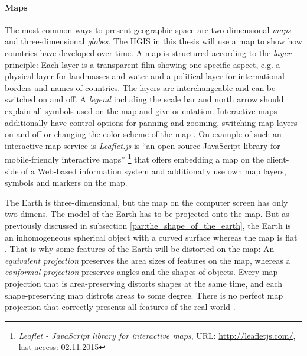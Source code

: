 
\paragraph{Maps} %
\label{par:maps}

The most common ways to present geographic space are two-dimensional \emph{maps} and three-dimensional \emph{globes}. The HGIS in this thesis will use a map to show how countries have developed over time. A map is structured according to the \emph{layer} principle: Each layer is a transparent film showing one specific aspect, e.g. a physical layer for landmasses and water and a political layer for international borders and names of countries. The layers are interchangeable and can be switched on and off. A \emph{legend} including the scale bar and north arrow should explain all symbols used on the map and give orientation. Interactive maps additionally have control options for panning and zooming, switching map layers on and off or changing the color scheme of the map
\cite[pp. 159-166]{bolstad2008gis}.
On example of such an interactive map service is \emph{Leaflet.js} is ``an open-source JavaScript library for mobile-friendly interactive maps''
\footnote{
  \textit{Leaflet - JavaScript library for interactive maps},
  URL: \url{http://leafletjs.com/},
  last access: 02.11.2015
}
that offers embedding a map on the client-side of a Web-based information system and additionally use own map layers, symbols and markers on the map.

The Earth is three-dimensional, but the map on the computer screen has only two dimens. The model of the Earth has to be projected onto the map. But as previously discussed in subsection \ref{par:the_shape_of_the_earth}, the Earth is an inhomogeneous spherical object with a curved surface whereas the map is flat
\cite[p.79]{bolstad2008gis}.
That is why some features of the Earth will be distorted on the map: An \emph{equivalent projection} preserves the area sizes of features on the map, whereas a \emph{conformal projection} preserves angles and the shapes of objects. Every map projection that is area-preserving distorts shapes at the same time, and each shape-preserving map distrots areas to some degree. There is no perfect map projection that correctly presents all features of the real world
\cite{mapProjectionGeokov}.

